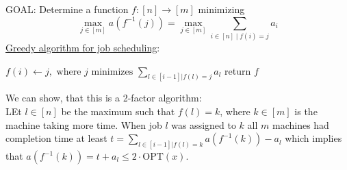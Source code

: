 \documentclass[a4paper, 12pt]{article}
\begin{document}
	\noindent GOAL: Determine a function $f: [n] \to [m]$ minimizing \[\max_{j \in [m]} a(f^{-1}(j)) = \max_{j \in [m]} \sum_{i \in [n] \; | \; f(i) = j} a_i\]
	\newpage
	\noindent\underline{Greedy algorithm for job scheduling}:
	\begin{algorithmic}
			\State $f(i) \gets j, \text{ where $j$ minimizes } \sum_{l \in [i-1] | f(l) = j} a_l$
		\EndFor
		\State return $f$
	\end{algorithmic}
	We can show, that this is a 2-factor algorithm:\\
	LEt $l \in [n]$ be the maximum such that $f(l) = k$, where $k \in [m]$ is the machine taking more time. When job $l$ was assigned to $k$ all $m$ machines had completion time at least $t = \sum_{l \in [i-1] | f(l) = k} a(f^{-1}(k))-a_l$ which implies that $a(f^{-1}(k)) = t+a_l \leq 2\cdot\text{OPT}(x)$.
\end{document}
